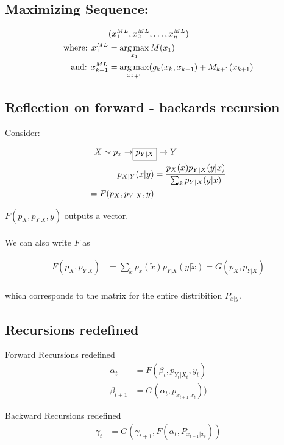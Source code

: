 \documentclass{article}
\begin{document}
 
 \subsection{Maximizing Sequence:}
 \begin{align*}
 &(x_{1}^{ML}, x_{2}^{ML}, \dots , x_{n}^{ML})\\
 \text{where: } x_{1}^{ML} &= \operatorname*{arg\,max}_{x_1} M(x_1)\\
 \text{and: } x_{k+1}^{ML} &= \operatorname*{arg\,max}_{x_{k+1}} ( g_k(x_k, x_{k+1}) + M_{k+1} (x_{k+1})
 \end{align*}

\subsection{Reflection on forward - backards recursion}

Consider:

\begin{align*}
X \sim p_x \rightarrow \Aboxed{p_{Y|X}} \rightarrow Y\\
p_{X|Y}(x|y) &= \frac{p_X(x) p_{Y|X}(y|x)}{\sum_{\tilde{x}}^{} p_{Y|X}(y|x)}\\
= F(p_X, p_{Y|X}, y) \\
\end{align*}

$F(p_X, p_{Y|X}, y)$ outputs a vector.
\\
\\
We can also write $F$ as

\begin{align*}
F(p_{X}, p_{Y|X}) &= \sum_{\tilde{x}}^{} p_x(\tilde{x})p_{Y|X}(y|\tilde{x}) = G(p_X, p_{Y|X})\\
\end{align*}

which corresponds to the matrix for the entire distribition $P_{x|y}$.
\subsection{Recursions redefined}

Forward Recursions redefined
\begin{align}
\alpha_t&= F(\beta_t, p_{Y_t|X_t}, y_t)\\
\beta_{t+1} &= G(\alpha_t, p_{x_{t+1} | x_t}))
\end{align}

Backward Recursions redefined
\begin{align}
\gamma_t &= G(\gamma_{t+1}, F(\alpha_t, P_{x_{t+1} | x_t}))
\end{align}
\end{document}
